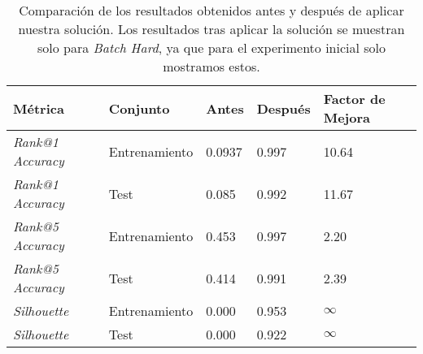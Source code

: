 \begin{table}[!hbtp]
    \centering
    \begin{tabular}{|l|l|l|l|l|}
        \hline
        Métrica & Conjunto & Antes & Después & Factor de Mejora \\
        \hline
        \textit{Rank@1 Accuracy} & Entrenamiento & 0.0937 & 0.997 & 10.64  \\
        \textit{Rank@1 Accuracy} & Test & 0.085 & 0.992 & 11.67  \\
        \textit{Rank@5 Accuracy} & Entrenamiento & 0.453 & 0.997 & 2.20 \\
        \textit{Rank@5 Accuracy} & Test & 0.414 & 0.991 & 2.39 \\
        \textit{Silhouette} & Entrenamiento & 0.000 & 0.953 & $\infty$ \\
        \textit{Silhouette} & Test & 0.000 & 0.922 & $\infty$ \\
        \hline

    \end{tabular}
    \caption{Comparación de los resultados obtenidos antes y después de aplicar nuestra solución. Los resultados tras aplicar la solución se muestran solo para \textit{Batch Hard}, ya que para el experimento inicial solo mostramos estos.}
    \label{table:comparaciones_mnist_resultados}
\end{table}

